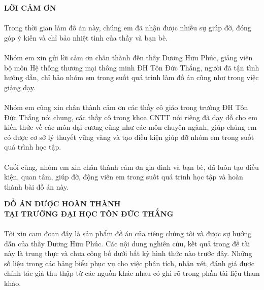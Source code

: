 \documentclass{report}
\begin{document}

\pagestyle{fancy}
\fancyhf{}
\chead{\thepage}
\renewcommand{\headrulewidth}{0pt}
\begin{center}
	\setcounter{page}{1}
	\fontsize{16}{20}\selectfont
	\textbf{LỜI CẢM ƠN\\} 
\end{center}
	\fontsize{13}{15}\selectfont
	\paragraph{}
        Trong thời gian làm đồ án này, chúng em đã nhận được nhiều sự giúp đỡ, đóng góp ý kiến và chỉ bảo nhiệt tình của thầy và bạn bè.
        \paragraph{}
        Nhóm em xin gửi lời cảm ơn chân thành đến thầy Dương Hữu Phúc, giảng viên bộ môn Hệ thống thương mại thông minh ĐH Tôn Đức Thắng, người đã tận tình hướng dẫn, chỉ bảo nhóm em trong suốt quá trình làm đồ án cũng như trong việc giảng dạy.
        \paragraph{}
        Nhóm em cũng xin chân thành cảm ơn các thầy cô giáo trong trường ĐH Tôn Đức Thắng nói chung, các thầy cô trong khoa CNTT nói riêng đã dạy dỗ cho em kiến thức về các môn đại cương cũng như các môn chuyên ngành, giúp chúng em có được cơ sở lý thuyết vững vàng và tạo điều kiện giúp đỡ nhóm em trong suốt quá trình học tập.
        \paragraph{}
        Cuối cùng, nhóm em xin chân thành cảm ơn gia đình và bạn bè, đã luôn tạo điều kiện, quan tâm, giúp đỡ, động viên em trong suốt quá trình học tập và hoàn thành bài đồ án này.
\pagebreak

\begin{center}
	\fontsize{16}{20}\selectfont
	\textbf{ĐỒ ÁN ĐƯỢC HOÀN THÀNH}\\
	\textbf{TẠI TRƯỜNG ĐẠI HỌC TÔN ĐỨC THẮNG\\} 
\end{center}
\fontsize{13}{15}\selectfont
\paragraph{}
Tôi xin cam đoan đây là sản phẩm đồ án của riêng  chúng tôi và được sự hướng dẫn của thầy Dương Hữu Phúc. Các nội dung nghiên cứu, kết quả trong đề tài này là trung thực và chưa công bố dưới bất kỳ hình thức nào trước đây. Những số liệu trong các bảng biểu phục vụ cho việc phân tích, nhận xét, đánh giá được chính tác giả thu thập từ các nguồn khác nhau có ghi rõ trong phần tài liệu tham khảo.
\end{document}

